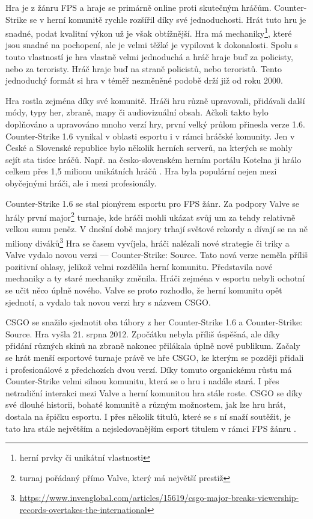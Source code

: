 Hra je z žánru \ac{FPS} a hraje se primárně online proti skutečným hráčům. Counter-Strike se v herní komunitě rychle rozšířil díky své jednoduchosti.
Hrát tuto hru je snadné, podat kvalitní výkon už je však obtížnější. Hra má mechaniky\footnote{herní prvky či unikátní vlastnosti},
které jsou snadné na pochopení, ale je velmi těžké je vypilovat k dokonalosti. Spolu s touto vlastností je hra vlastně velmi jednoduchá a hráč hraje buď za policisty, nebo za
teroristy. Hráč hraje buď na straně policistů, nebo teroristů. Tento jednoduchý formát si hra v téměř nezměněné podobě drží již od roku 2000.

Hra rostla zejména díky své komunitě. Hráči hru různě upravovali, přidávali další módy, typy her, zbraně, mapy či audiovizuální obsah. Ačkoli takto bylo doplňováno a upravováno
mnoho verzí hry,  první velký průlom přinesla verze 1.6. Counter-Strike 1.6 vynikal v oblasti esportu i v rámci hráčské komunity. Jen v České a Slovenské republice bylo několik
herních serverů, na kterých se mohly sejít sta tisíce hráčů. Např. na česko-slovenském herním portálu Kotelna ji hrálo celkem přes 1,5 milionu unikátních hráčů
\cite{cskocs_kotelna_2022}. Hra byla populární nejen mezi obyčejnými hráči, ale i mezi profesionály.

Counter-Strike 1.6 se stal pionýrem esportu pro \ac{FPS} žánr. Za podpory Valve se hrály první major\footnote{turnaj pořádaný přímo Valve, který má největší prestiž} turnaje,
kde hráči mohli ukázat svůj um za tehdy relativně velkou sumu peněz. V dnešní době majory trhají světové rekordy a dívají se na ně miliony
diváků\footnote{\scriptsize \url{https://www.invenglobal.com/articles/15619/csgo-major-breaks-viewership-records-overtakes-the-international}}
Hra se časem vyvíjela, hráči nalézali nové strategie či triky a Valve vydalo novou verzi ---  Counter-Strike: Source. Tato nová verze neměla příliš pozitivní ohlasy,
jelikož velmi rozdělila herní komunitu. Představila nové mechaniky a ty staré mechaniky změnila. Hráči zejména v esportu nebyli ochotní se učit něco úplně nového. Valve se proto
rozhodlo, že herní komunitu opět sjednotí, a vydalo tak novou verzi hry s názvem \ac{CSGO}.

\ac{CSGO} se snažilo sjednotit oba tábory z her 
Counter-Strike 1.6 a Counter-Strike: Source. Hra vyšla 21. srpna 2012. Zpočátku nebyla příliš úspěšná, ale díky přidání různých
skinů \cite{valve_counterstrike_2013} na zbraně nakonec přilákala úplně nové publikum. Začaly se hrát menší esportové turnaje právě ve hře \ac{CSGO}, ke kterým se
později přidali i profesionálové z předchozích dvou verzí. Díky tomuto organickému růstu má Counter-Strike velmi silnou komunitu, která se o hru i nadále stará. I přes netradiční
interakci mezi Valve a herní komunitou hra stále roste. \ac{CSGO} se díky své dlouhé historii, bohaté komunitě a různým možnostem, jak lze hru hrát, dostala na špičku
esportu. I přes několik titulů, které se s ní snaží soutěžit, je tato hra stále největším a nejsledovanějším esport titulem v rámci \ac{FPS} žánru \cite{henningson_history_2020}.

